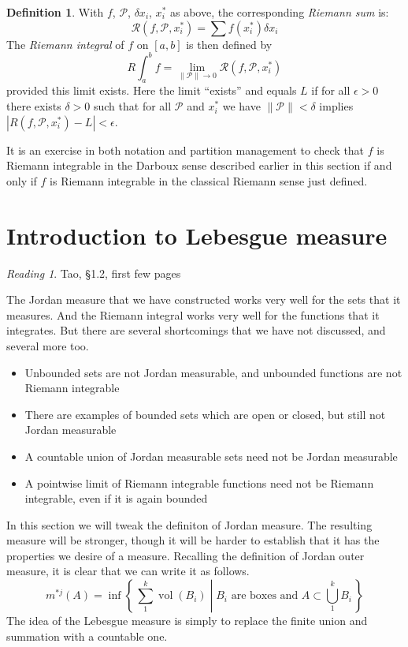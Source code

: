 \documentclass[11pt,oneside]{amsbook}
\newcommand{\set}[1]{\left\{\,#1\,\right\}}
\DeclareMathOperator{\vol}{vol}
\theoremstyle{definition}
\theoremstyle{plain}
\theoremstyle{definition}
\newtheorem{defn}[thm]{Definition}
\theoremstyle{remark}
\newtheorem*{reading}{Reading}
\numberwithin{equation}{section}
\numberwithin{figure}{section}
\begin{document}
\begin{defn}
  With $f$, $\mathcal P$, $\delta x_i$, $x_i^*$ as above, the corresponding \emph{Riemann sum} is:
  \[\mathcal R(f,\mathcal  P,x_i^*)=\sum f(x_i^*)\delta x_i
  \]
  The \emph{Riemann integral} of $f$ on $[a,b]$ is then defined by
  \[R\int_a^b f=\lim_{\|\mathcal P\|\to0}\mathcal R(f,\mathcal P,x_i^*)
  \]
  provided this limit exists. Here the limit ``exists'' and equals $L$ if for all $\epsilon>0$ there exists $\delta>0$ such that for all $\mathcal P$ and $x_i^*$ we have $\|\mathcal P\|<\delta$ implies $|R(f,\mathcal P,x_i^*)-L|<\epsilon$.
\end{defn}

It is an exercise in both notation and partition management to check that $f$ is Riemann integrable in the Darboux sense described earlier in this section if and only if $f$ is Riemann integrable in the classical Riemann sense just defined.

\newpage
\section{Introduction to Lebesgue measure}

\begin{reading}
  Tao, \S1.2, first few pages
\end{reading}

The Jordan measure that we have constructed works very well for the sets that it measures. And the Riemann integral works very well for the functions that it integrates. But there are several shortcomings that we have not discussed, and several more too.
\begin{itemize}
\item Unbounded sets are not Jordan measurable, and unbounded functions are not Riemann integrable
\item There are examples of bounded sets which are open or closed, but still not Jordan measurable
\item A countable union of Jordan measurable sets need not be Jordan measurable
\item A pointwise limit of Riemann integrable functions need not be Riemann integrable, even if it is again bounded
\end{itemize}

In this section we will tweak the definiton of Jordan measure. The resulting measure will be stronger, though it will be harder to establish that it has the properties we desire of a measure. Recalling the definition of Jordan outer measure, it is clear that we can write it as follows.
\[m^{*j}(A)=\inf\set{\left.\sum_1^k \vol(B_i)\;\right|\;\text{$B_i$ are boxes and }A\subset\bigcup_1^kB_i}
\]
The idea of the Lebesgue measure is simply to replace the finite union and summation with a countable one.
\end{document}
